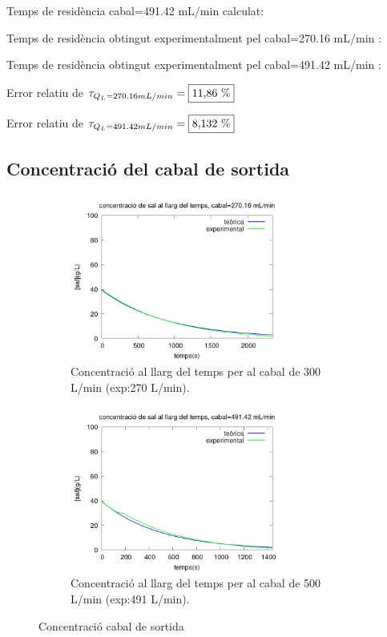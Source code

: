 \documentclass[10pt, twoside]{article}
\begin{document}
Temps de residència cabal=491.42 mL/min calculat: 

Temps de residència obtingut experimentalment pel cabal=270.16 mL/min : 

Temps de residència obtingut experimentalment pel cabal=491.42 mL/min : 

Error relatiu de $\tau_{Q_L = 270.16 mL/min} = \fbox{11,86 \%}$

Error relatiu de $\tau_{Q_L = 491.42 mL/min} = \fbox{8,132 \%}$

\subsection{Concentració del cabal de sortida}

\begin{figure}[hbt!]
    \centering
    \begin{subfigure}{0.45\textwidth}
        \centering
        \includegraphics[width=\textwidth]{conc300.png}
        \caption{Concentració al llarg del temps per al cabal de 300 L/min (exp:270 L/min).}
        \label{fig:conc300}
    \end{subfigure}
    \hspace{0.025\textwidth}
    \begin{subfigure}{0.45\textwidth}
        \centering
        \includegraphics[width=\textwidth]{conc500.png}
        \caption{Concentració al llarg del temps per al cabal de 500 L/min (exp:491 L/min).}
        \label{fig:conc500}
    \end{subfigure}
    \caption{Concentració cabal de sortida}
    \label{fig:concs}
\end{figure}
\end{document}
